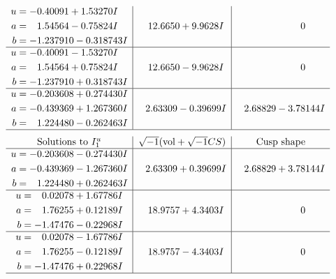 \documentclass[1p]{elsarticle_modified}
\theoremstyle{definition}
\newcommand{\I}{\sqrt{-1}}
\begin{document}
$$\begin{array}{c|c|c}
\begin{aligned}
u &= -0.40091 + 1.53270 I \\
a &= \phantom{-}1.54564 - 0.75824 I \\
b &= -1.237910 - 0.318743 I\end{aligned}
 & \phantom{-}12.6650 + 9.9628 I & \phantom{-0.000000 } 0 \\ \hline\begin{aligned}
u &= -0.40091 - 1.53270 I \\
a &= \phantom{-}1.54564 + 0.75824 I \\
b &= -1.237910 + 0.318743 I\end{aligned}
 & \phantom{-}12.6650 - 9.9628 I & \phantom{-0.000000 } 0 \\ \hline\begin{aligned}
u &= -0.203608 + 0.274430 I \\
a &= -0.439369 + 1.267360 I \\
b &= \phantom{-}1.224480 - 0.262463 I\end{aligned}
 & \phantom{-}2.63309 - 0.39699 I & \phantom{-}2.68829 - 3.78144 I\\
 \hline 
 \end{array}$$\newpage$$\begin{array}{c|c|c}  
\text{Solutions to }I^u_{1}& \I (\text{vol} + \sqrt{-1}CS) & \text{Cusp shape}\\
 \hline 
\begin{aligned}
u &= -0.203608 - 0.274430 I \\
a &= -0.439369 - 1.267360 I \\
b &= \phantom{-}1.224480 + 0.262463 I\end{aligned}
 & \phantom{-}2.63309 + 0.39699 I & \phantom{-}2.68829 + 3.78144 I \\ \hline\begin{aligned}
u &= \phantom{-}0.02078 + 1.67786 I \\
a &= \phantom{-}1.76255 + 0.12189 I \\
b &= -1.47476 - 0.22968 I\end{aligned}
 & \phantom{-}18.9757 + 4.3403 I & \phantom{-0.000000 } 0 \\ \hline\begin{aligned}
u &= \phantom{-}0.02078 - 1.67786 I \\
a &= \phantom{-}1.76255 - 0.12189 I \\
b &= -1.47476 + 0.22968 I\end{aligned}
 & \phantom{-}18.9757 - 4.3403 I & \phantom{-0.000000 } 0\\
 \hline 
 \end{array}$$\newpage\newpage\renewcommand{\arraystretch}{1}
\end{document}
